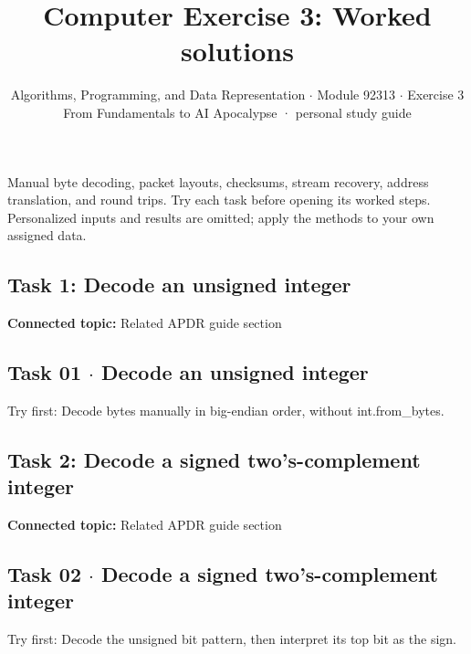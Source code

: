 \documentclass[11pt]{article}
\title{\sffamily\bfseries\color{FAUblue}Computer Exercise 3: Worked solutions}
\author{Algorithms, Programming, and Data Representation \ensuremath{\cdot} Module 92313 \ensuremath{\cdot} Exercise 3\\[2pt]\small From Fundamentals to AI Apocalypse · personal study guide}
\date{}
\begin{document}
\maketitle
\begingroup\footnotesize\setlength{\parskip}{0pt}\tableofcontents\endgroup
\clearpage

{\large Manual byte decoding, packet layouts, checksums, stream recovery, address translation, and round trips. Try each task before opening its worked steps. Personalized inputs and results are omitted; apply the methods to your own assigned data.}


\begin{keepsection}
\section{Task 1: Decode an unsigned integer}

\textbf{Connected topic:} Related APDR guide section

\begin{keepsection}
\subsection{Task 01 \ensuremath{\cdot} Decode an unsigned integer}

Try first: Decode bytes manually in big-endian order, without int.from\_bytes.

\end{keepsection}
\end{keepsection}

\begin{keepsection}
\section{Task 2: Decode a signed two’s-complement integer}

\textbf{Connected topic:} Related APDR guide section

\begin{keepsection}
\subsection{Task 02 \ensuremath{\cdot} Decode a signed two’s-complement integer}

Try first: Decode the unsigned bit pattern, then interpret its top bit as the sign.

\end{keepsection}
\end{keepsection}
\end{document}
